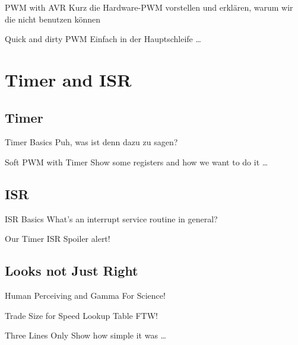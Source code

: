 \documentclass{beamer}
\begin{document}
\begin{frame}{PWM with AVR}
    Kurz die Hardware-PWM vorstellen und erklären, warum wir die nicht benutzen können
\end{frame}

\begin{frame}{Quick and dirty PWM}
    Einfach in der Hauptschleife …
\end{frame}

\section{Timer and ISR}

\subsection{Timer}

\begin{frame}{Timer Basics}
    Puh, was ist denn dazu zu sagen?
\end{frame}

\begin{frame}{Soft PWM with Timer}
    Show some registers and how we want to do it …
\end{frame}

\subsection{ISR}

\begin{frame}{ISR Basics}
    What's an interrupt service routine in general?
\end{frame}

\begin{frame}{Our Timer ISR}
    Spoiler alert!
\end{frame}

\subsection{Looks not Just Right}

\begin{frame}{Human Perceiving and Gamma}
    For Science!
\end{frame}

\begin{frame}{Trade Size for Speed}
    Lookup Table FTW!
\end{frame}

\begin{frame}{Three Lines Only}
    Show how simple it was …
\end{frame}
\end{document}
